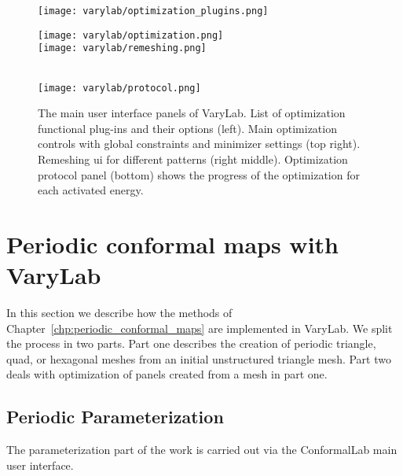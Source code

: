 \documentclass[Thesis.tex]{subfiles}
\begin{document}
\begin{figure}
\begin{center}
\texttt{[image: varylab/optimization\_plugins.png]}\hfill
\begin{minipage}[b]{0.47\linewidth}
\texttt{[image: varylab/optimization.png]}\\
\texttt{[image: varylab/remeshing.png]}
\end{minipage}\\
\vskip 0.05cm
\texttt{[image: varylab/protocol.png]}
\caption{The main user interface panels of {\sc VaryLab}. List of optimization functional plug-ins and their options (left). Main optimization controls with global constraints and minimizer settings (top right). Remeshing ui for different patterns (right middle). Optimization protocol panel (bottom) shows the progress of the optimization for each activated energy.}
\label{fig:user_interface_varylab}
\end{center}
\end{figure}


\section{Periodic conformal maps with {\sc VaryLab}}
\label{sec:periodic_varylab}
In this section we describe how the methods of Chapter~\ref{chp:periodic_conformal_maps} are implemented in {\sc VaryLab}. We split the process in two parts. Part one describes the creation of periodic triangle, quad, or hexagonal meshes from an initial unstructured triangle mesh. Part two deals with optimization of panels created from a mesh in part one.

\subsection{Periodic Parameterization}
The parameterization part of the work is carried out via the {\sc ConformalLab} main user interface. 
\end{document}
